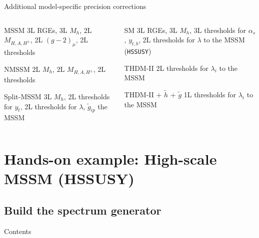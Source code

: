 \documentclass[hyperref={pdfpagelabels=false},ngerman]{beamer}
\newcommand{\as}{\alpha_s}
\begin{document}
\begin{frame}{Additional model-specific precision corrections}
  \begin{columns}[T]
    \begin{column}{0.49\textwidth}
      \begin{modelblock}{MSSM}
        3L RGEs, 3L $M_h$, 2L $M_{H,A,H^\pm}$, 2L $(g-2)_\mu$, 2L
        thresholds
      \end{modelblock}
      \begin{modelblock}{NMSSM}
        2L $M_h$, 2L $M_{H,A,H^\pm}$, 2L thresholds
      \end{modelblock}
      \begin{modelblock}{Split-MSSM}
        3L $M_h$, 2L thresholds for $y_t$, 2L thresholds for $\lambda$, $\tilde{g}_{ip}$
        the MSSM
      \end{modelblock}
    \end{column}
    \begin{column}{0.49\textwidth}
      \begin{modelblock}{SM}
        3L RGEs, 3L $M_h$, 3L thresholds for $\as$, $y_{t,b}$, 2L
        thresholds for $\lambda$ to the MSSM (\texttt{HSSUSY})
      \end{modelblock}
      \begin{modelblock}{THDM-II}
        2L thresholds for $\lambda_i$ to the MSSM
      \end{modelblock}
      \begin{modelblock}{THDM-II + $\tilde{h}$ + $\tilde{g}$}
        1L thresholds for $\lambda_i$ to the MSSM
      \end{modelblock}
    \end{column}
  \end{columns}
\end{frame}

\section{Hands-on example: High-scale MSSM (HSSUSY)}

\subsection{Build the spectrum generator}

\begin{frame}{Contents}
  \tableofcontents[currentsubsection,sectionstyle=show/shaded]  
\end{frame}
\end{document}
